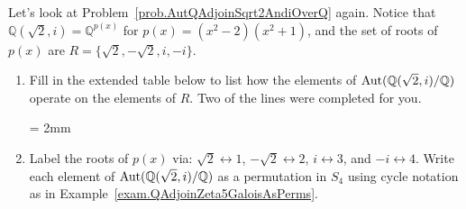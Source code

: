 \begin{problem}\label{prob.AutQAdjoinSqrt2AndiOverQAsPerms}
Let's look at Problem~\ref{prob.AutQAdjoinSqrt2AndiOverQ} again. Notice that $\mathbb{Q}(\sqrt{2},i) = \mathbb{Q}^{p(x)}$ for $p(x) = (x^2-2)(x^2+1)$, and the set of roots of $p(x)$ are $R=\{\sqrt{2},-\sqrt{2},i,-i\}$. 
\begin{enumerate}
\item Fill in the extended table below to list how the elements of $\operatorname{Aut}(\mathbb{Q}(\sqrt{2},i)/\mathbb{Q})$ operate on the elements of $R$. Two of the lines were completed for you.
\begin{center}
\tabulinesep = 2mm
\end{center}
\item Label the roots of $p(x)$ via: $\sqrt{2} \leftrightarrow 1$, $-\sqrt{2}  \leftrightarrow 2$, $i \leftrightarrow 3$, and $-i \leftrightarrow 4$. Write each element of $\operatorname{Aut}(\mathbb{Q}(\sqrt{2},i)/\mathbb{Q})$ as a permutation in $S_4$ using cycle notation as in Example~\ref{exam.QAdjoinZeta5GaloisAsPerms}.
\end{enumerate}
\end{problem}


